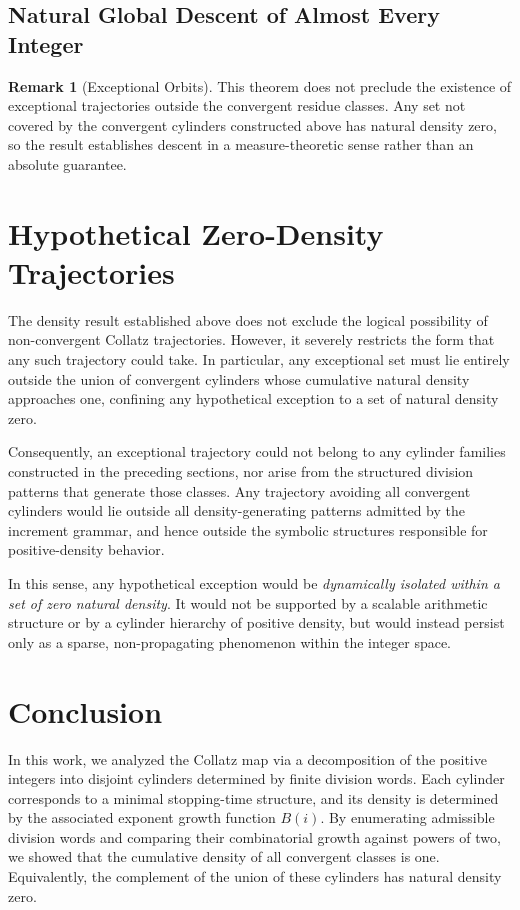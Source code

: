 \documentclass[12pt, oneside]{article}   	%
\numberwithin{equation}{section}          %
\theoremstyle{definition}
\newtheorem*{remark}{Remark}
\begin{document}
\subsection{Natural Global Descent of Almost Every Integer}

\begin{remark}[Exceptional Orbits]
This theorem does not preclude the existence of exceptional trajectories outside
the convergent residue classes. Any set not covered by the convergent cylinders
constructed above has natural density zero, so the result establishes descent
in a measure-theoretic sense rather than an absolute guarantee.
\end{remark}


\section{Hypothetical Zero-Density Trajectories}

The density result established above does not exclude the logical possibility of
non-convergent Collatz trajectories. However, it severely restricts the form that
any such trajectory could take. In particular, any exceptional set must lie entirely
outside the union of convergent cylinders whose cumulative natural density
approaches one, confining any hypothetical exception to a set of natural density zero.

Consequently, an exceptional trajectory could not belong to any cylinder
families constructed in the preceding sections, nor arise from the structured division
patterns that generate those classes. Any trajectory avoiding all convergent cylinders
would lie outside all density-generating patterns admitted by the increment grammar,
and hence outside the symbolic structures responsible for positive-density behavior.

In this sense, any hypothetical exception would be \emph{dynamically isolated within
a set of zero natural density}.  It would not be supported by a scalable arithmetic
structure or by a cylinder hierarchy of positive density, but would instead persist
only as a sparse, non-propagating phenomenon within the integer space.


\newpage
\section{Conclusion}

In this work, we analyzed the Collatz map via a decomposition of the positive integers
into disjoint cylinders determined by finite division words. Each cylinder corresponds to
a minimal stopping-time structure, and its density is determined by the associated
exponent growth function $B(i)$. By enumerating admissible division words and comparing
their combinatorial growth against powers of two, we showed that the cumulative density
of all convergent classes is one. Equivalently, the complement of the union of these
cylinders has natural density zero.
\end{document}
